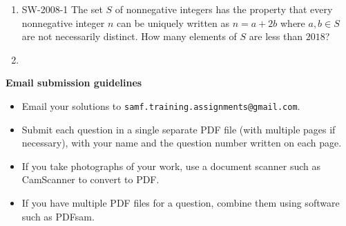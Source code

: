 \documentclass{article}
\begin{document}
\begin{enumerate}[1.]
\vspace{6pt}
\item SW-2008-1
The set $S$ of nonnegative integers has the property that every nonnegative integer $n$ can be uniquely written as $n = a+2b$ where $a,b \in S$ are not necessarily distinct. How many elements of $S$ are less than $2018$?


\vspace{6pt}
\item %


\end{enumerate}


\vfill
\textbf{\Large Email submission guidelines}
\begin{itemize}
	\item Email your solutions to \verb!samf.training.assignments@gmail.com!.
	\item Submit each question in a single separate PDF file (with multiple pages if necessary), with your name and the question number written on each page.
	\item If you take photographs of your work, use a document scanner such as CamScanner to convert to PDF.
	\item If you have multiple PDF files for a question, combine them using software such as PDFsam.
\end{itemize}
\end{document}
